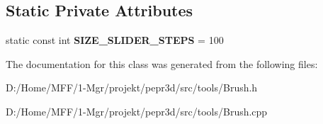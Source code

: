 \subsection*{Static Private Attributes}
\begin{DoxyCompactItemize}
\item 
\mbox{\label{classpepr3d_1_1_brush_a5972a5bd5dfabb665294af0a1e3fc2e3}} 
static const int {\bfseries S\+I\+Z\+E\+\_\+\+S\+L\+I\+D\+E\+R\+\_\+\+S\+T\+E\+PS} = 100
\end{DoxyCompactItemize}


The documentation for this class was generated from the following files\+:\begin{DoxyCompactItemize}
\item 
D\+:/\+Home/\+M\+F\+F/1-\/\+Mgr/projekt/pepr3d/src/tools/Brush.\+h\item 
D\+:/\+Home/\+M\+F\+F/1-\/\+Mgr/projekt/pepr3d/src/tools/Brush.\+cpp\end{DoxyCompactItemize}
